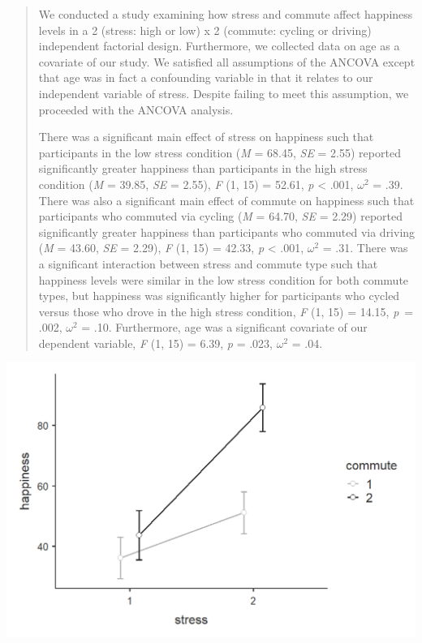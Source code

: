 \documentclass[
]{book}
\begin{document}
\begin{quote}
We conducted a study examining how stress and commute affect happiness levels in a 2 (stress: high or low) x 2 (commute: cycling or driving) independent factorial design. Furthermore, we collected data on age as a covariate of our study. We satisfied all assumptions of the ANCOVA except that age was in fact a confounding variable in that it relates to our independent variable of stress. Despite failing to meet this assumption, we proceeded with the ANCOVA analysis.

There was a significant main effect of stress on happiness such that participants in the low stress condition (\emph{M} = 68.45, \emph{SE} = 2.55) reported significantly greater happiness than participants in the high stress condition (\emph{M} = 39.85, \emph{SE} = 2.55), \emph{F} (1, 15) = 52.61, \emph{p} \textless{} .001, \(\omega^2\) = .39. There was also a significant main effect of commute on happiness such that participants who commuted via cycling (\emph{M} = 64.70, \emph{SE} = 2.29) reported significantly greater happiness than participants who commuted via driving (\emph{M} = 43.60, \emph{SE} = 2.29), \emph{F} (1, 15) = 42.33, \emph{p} \textless{} .001, \(\omega^2\) = .31. There was a significant interaction between stress and commute type such that happiness levels were similar in the low stress condition for both commute types, but happiness was significantly higher for participants who cycled versus those who drove in the high stress condition, \emph{F} (1, 15) = 14.15, \emph{p}~= .002, \(\omega^2\) = .10. Furthermore, age was a significant covariate of our dependent variable, \emph{F} (1, 15) = 6.39, \emph{p} = .023, \(\omega^2\) = .04.
\end{quote}

\includegraphics{images/07-ancova/ancova_interaction.png}
\end{document}
